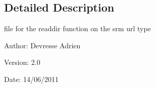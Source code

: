 \subsection{Detailed Description}
file for the readdir function on the srm url type 

\begin{Desc}
\item[Author:]Devresse Adrien \end{Desc}
\begin{Desc}
\item[Version:]2.0 \end{Desc}
\begin{Desc}
\item[Date:]14/06/2011 \end{Desc}
